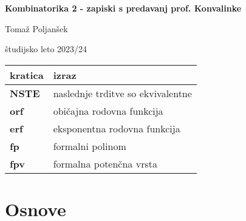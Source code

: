\documentclass[a4paper, 12pt]{book}
\title{\ttitle}
\author{\tauthor}
\date{\tdate}
\newcommand{\ttitle}{Kombinatorika 2 - zapiski s predavanj prof. Konvalinke}
\newcommand{\tauthor}{Tomaž Poljanšek}
\newcommand{\tdate}{študijsko leto 2023/24}
\theoremstyle{definition}
\theoremstyle{remark}
\newcommand\mymaketitle{
  \begin{titlepage}
    \begin{center}
        \vspace*{4cm}
        \Huge
        \textbf{\ttitle}
                        
        \vspace{1.5cm}
        \huge
        \tauthor
            
        \vspace{3cm}
        \Large
        \tdate
    \end{center}
  \end{titlepage}
}
\begin{document}
\renewcommand{\thepage}{}
\newcommand{\sn}[1]{"`#1"'}

\mymaketitle

\clearpage

\frontmatter

\pagestyle{empty}
\def\thepage{}
\tableofcontents{}

\def\x{\hspace{3ex}}    %
\def\y{\hspace{2.45ex}}  %
\def\z{\hspace{1.9ex}}    %
\stackMath



\noindent\begin{tabular}{p{}|p{}}
  {\bf kratica} & izraz \\ \hline
  {\bf NSTE} & naslednje trditve so ekvivalentne \\
  {\bf orf} & običajna rodovna funkcija \\
  {\bf erf} & eksponentna rodovna funkcija \\
  {\bf fp} & formalni polinom \\
  {\bf fpv} & formalna potenčna vrsta \\

\end{tabular}




\mainmatter
\setcounter{page}{1}
\pagestyle{fancy}





\chapter{Osnove}
\end{document}
